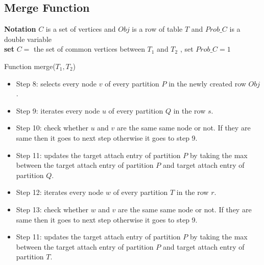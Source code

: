 \documentclass[11pt]{article}
\begin{document}
\subsection{Merge Function }
\begin{algorithm}[H]
\Indm  
{}

\textbf{Notation} $C$ is a set of vertices and $Obj$ is a row of table $T$ and $Prob\_C$ is a double variable\\
\Indp
\nl \textbf{set} $C=$ the set of common vertices between $T_1$ and $T_2$ , set $Prob\_C=1$\\
 \nl {}
\nl {}

 \caption{Function merge($T_1,T_2$)}
\end{algorithm}

\begin{itemize}
\item Step 8: selects every node $v$ of every partition $P$ in the newly created row $Obj$.
\item Step 9: iterates every node $u$ of every partition $Q$ in the row $s$.
\item Step 10: check whether $u$ and $v$ are the same same node or not. If they are same then it goes to next step otherwise it goes to step 9.
\item Step 11: updates the target attach entry of partition $P$ by taking the max between the target attach entry of partition $P$ and target attach entry of partition $Q$.
\item Step 12: iterates every node $w$ of every partition $T$ in the row $r$.
\item Step 13: check whether $w$ and $v$ are the same same node or not. If they are same then it goes to next step otherwise it goes to step 9.
\item Step 11: updates the target attach entry of partition $P$ by taking the max between the target attach entry of partition $P$ and target attach entry of partition $T$.
\end{itemize}
\end{document}
